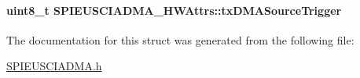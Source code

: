 \paragraph[{tx\-D\-M\-A\-Source\-Trigger}]{\setlength{\rightskip}{0pt plus 5cm}uint8\-\_\-t S\-P\-I\-E\-U\-S\-C\-I\-A\-D\-M\-A\-\_\-\-H\-W\-Attrs\-::tx\-D\-M\-A\-Source\-Trigger}\label{struct_s_p_i_e_u_s_c_i_a_d_m_a___h_w_attrs_a381d4d773f4c309e35eec9da42305037}


The documentation for this struct was generated from the following file\-:\begin{DoxyCompactItemize}
\item 
\hyperlink{_s_p_i_e_u_s_c_i_a_d_m_a_8h}{S\-P\-I\-E\-U\-S\-C\-I\-A\-D\-M\-A.\-h}\end{DoxyCompactItemize}
